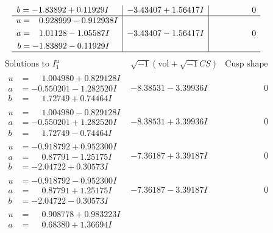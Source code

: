 \documentclass[1p]{elsarticle_modified}
\theoremstyle{definition}
\newcommand{\I}{\sqrt{-1}}
\begin{document}
$$\begin{array}{c|c|c}
\begin{aligned}
b &= -1.83892 + 0.11929 I\end{aligned}
 & -3.43407 + 1.56417 I & \phantom{-0.000000 } 0 \\ \hline\begin{aligned}
u &= \phantom{-}0.928999 - 0.912938 I \\
a &= \phantom{-}1.01128 - 1.05587 I \\
b &= -1.83892 - 0.11929 I\end{aligned}
 & -3.43407 - 1.56417 I & \phantom{-0.000000 } 0\\
 \hline 
 \end{array}$$\newpage$$\begin{array}{c|c|c}  
\text{Solutions to }I^u_{1}& \I (\text{vol} + \sqrt{-1}CS) & \text{Cusp shape}\\
 \hline 
\begin{aligned}
u &= \phantom{-}1.004980 + 0.829128 I \\
a &= -0.550201 - 1.282520 I \\
b &= \phantom{-}1.72749 + 0.74464 I\end{aligned}
 & -8.38531 - 3.39936 I & \phantom{-0.000000 } 0 \\ \hline\begin{aligned}
u &= \phantom{-}1.004980 - 0.829128 I \\
a &= -0.550201 + 1.282520 I \\
b &= \phantom{-}1.72749 - 0.74464 I\end{aligned}
 & -8.38531 + 3.39936 I & \phantom{-0.000000 } 0 \\ \hline\begin{aligned}
u &= -0.918792 + 0.952300 I \\
a &= \phantom{-}0.87791 - 1.25175 I \\
b &= -2.04722 + 0.30573 I\end{aligned}
 & -7.36187 + 3.39187 I & \phantom{-0.000000 } 0 \\ \hline\begin{aligned}
u &= -0.918792 - 0.952300 I \\
a &= \phantom{-}0.87791 + 1.25175 I \\
b &= -2.04722 - 0.30573 I\end{aligned}
 & -7.36187 - 3.39187 I & \phantom{-0.000000 } 0 \\ \hline\begin{aligned}
u &= \phantom{-}0.908778 + 0.983223 I \\
a &= \phantom{-}0.68380 + 1.36694 I \\

\end{aligned}
\end{array}$$
\end{document}
